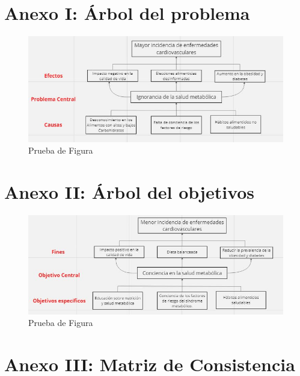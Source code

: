 \chapter{Anexo I: Árbol del problema}

\begin{figure}[h]
		\begin{center}
			\includegraphics[width=1.1\textwidth]{1/figures/arbol de problems.JPG}
			\caption{Prueba de Figura}
			\label{fig1}
		\end{center}
		
	\end{figure}

\chapter{Anexo II: Árbol del objetivos}

\begin{figure}[h]
		\begin{center}
			\includegraphics[width=1.1\textwidth]{1/figures/arbol de objetivos.JPG}
			\caption{Prueba de Figura}
			\label{fig1}
		\end{center}
		
	\end{figure}

\chapter{Anexo III: Matriz de Consistencia}

